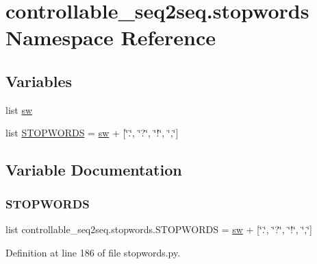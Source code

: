 \hypertarget{namespacecontrollable__seq2seq_1_1stopwords}{}\section{controllable\+\_\+seq2seq.\+stopwords Namespace Reference}
\label{namespacecontrollable__seq2seq_1_1stopwords}
\subsection*{Variables}
\begin{DoxyCompactItemize}
\item 
list \hyperlink{namespacecontrollable__seq2seq_1_1stopwords_ac68056fbf52a1287f3f0216f4124c2b3}{sw}
\item 
list \hyperlink{namespacecontrollable__seq2seq_1_1stopwords_a983ac1c23011267f6e078acae062554a}{S\+T\+O\+P\+W\+O\+R\+DS} = \hyperlink{namespacecontrollable__seq2seq_1_1stopwords_ac68056fbf52a1287f3f0216f4124c2b3}{sw} + \mbox{[}\char`\"{}.\char`\"{}, \char`\"{}?\char`\"{}, \char`\"{}!\char`\"{}, \char`\"{},\char`\"{}\mbox{]}
\end{DoxyCompactItemize}


\subsection{Variable Documentation}
\mbox{\label{namespacecontrollable__seq2seq_1_1stopwords_a983ac1c23011267f6e078acae062554a}} 
\subsubsection{\texorpdfstring{S\+T\+O\+P\+W\+O\+R\+DS}{STOPWORDS}}
{\footnotesize\ttfamily list controllable\+\_\+seq2seq.\+stopwords.\+S\+T\+O\+P\+W\+O\+R\+DS = \hyperlink{namespacecontrollable__seq2seq_1_1stopwords_ac68056fbf52a1287f3f0216f4124c2b3}{sw} + \mbox{[}\char`\"{}.\char`\"{}, \char`\"{}?\char`\"{}, \char`\"{}!\char`\"{}, \char`\"{},\char`\"{}\mbox{]}}



Definition at line 186 of file stopwords.\+py.

